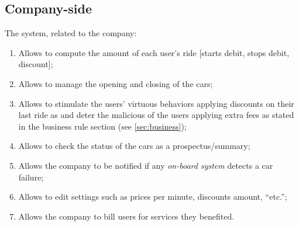 \documentclass{scrreprt}
\begin{document}
\subsection{Company-side}
The system, related to the company:

\begin{enumerate} [label=G\arabic*., resume]
\item Allows to compute the amount of each user's ride [starts debit, stops debit, discount];
\item Allows to manage the opening and closing of the cars;
\item Allows to stimulate the users' virtuous behaviors applying discounts on their last ride as and deter the malicious of the users applying extra fees as stated in the business rule section (see \vref{sec:business});
\item Allows to check the status of the cars as a prospectus/summary;
\item Allows the company to be notified if any {\itshape on-board system} detects a car failure;
\item Allows to edit settings such as prices per minute, discounts amount, “etc.”;
\item Allows the company to bill users for services they benefited.
\end{enumerate}

\begin{comment}$<$Summarize the major functions the product must perform or must let the user perform. Details will be provided in Section 3, so only a high level summary 
(such as a bullet list) is needed here. Organize the functions to make them 
understandable to any reader of the SRS. A picture of the major groups of 
related requirements and how they relate, such as a top level data flow diagram 
or object class diagram, is often effective.$>$
\end{comment}
\end{document}
